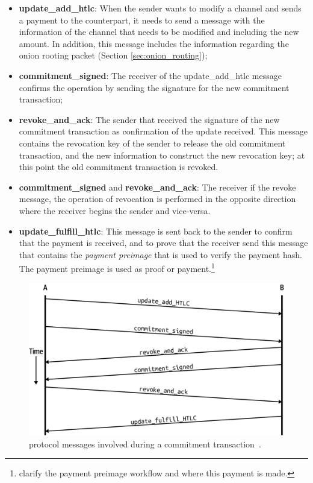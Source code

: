 \begin{itemize}
  \item {\bf update\_add\_htlc}: When the sender wants to modify a channel and sends a payment to the counterpart, it needs to send a message with the information of the channel that needs to be modified and including the new amount. In addition, this message includes  the information regarding the onion rooting packet (Section \ref{sec:onion_routing});
  
  \item {\bf commitment\_signed}: The receiver of the update\_add\_htlc message confirms the operation by sending the signature for the new commitment transaction;
  
  \item {\bf revoke\_and\_ack}: The sender that received the signature of the new commitment transaction as confirmation of the update received. This message contains the revocation key of the sender to release the old commitment transaction, and the new information to construct the new revocation key; at this point the old commitment transaction is revoked.
  
  \item {\bf commitment\_signed} and {\bf revoke\_and\_ack}: The receiver if the revoke message, the operation of revocation is performed in the opposite direction where the receiver begins the sender and vice-versa.
  
  \item {\bf update\_fulfill\_htlc}: This message is sent back to the sender to confirm that the payment is received,
      and to prove that the receiver send this message that contains the \emph{payment preimage} 
        that is used to verify the payment hash. The payment preimage is used as proof or payment.\footnote{clarify the payment preimage workflow and where this payment is made.}
\end{itemize}


\begin{figure}[h]
  \begin{center}
  \includegraphics[width=0.6\columnwidth]{imgs/mtln_0903.png}
  \end{center}
    \caption{{\LN} protocol messages involved during a commitment transaction~\cite{lnbook}.}
  \label{fig:commitment_transaction_ln_messages}
\end{figure}


